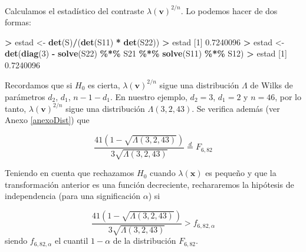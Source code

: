 \documentclass[
  a4paper,
  oneside]{scrbook}
\newenvironment{Shaded}{\begin{snugshade}}{\end{snugshade}}
\newcommand{\DecValTok}[1]{\textcolor[rgb]{0.00,0.00,0.81}{#1}}
\newcommand{\FloatTok}[1]{\textcolor[rgb]{0.00,0.00,0.81}{#1}}
\newcommand{\FunctionTok}[1]{\textcolor[rgb]{0.13,0.29,0.53}{\textbf{#1}}}
\newcommand{\NormalTok}[1]{#1}
\newcommand{\OtherTok}[1]{\textcolor[rgb]{0.56,0.35,0.01}{#1}}
\newcommand{\SpecialCharTok}[1]{\textcolor[rgb]{0.81,0.36,0.00}{\textbf{#1}}}
\theoremstyle{definition}
\theoremstyle{definition}
\theoremstyle{definition}
\theoremstyle{definition}
\theoremstyle{remark}
\begin{document}
Calculamos el estadístico del contraste \(\lambda(\bm{v})^{2/n}\). Lo
podemos hacer de dos formas:

\footnotesize

\begin{Shaded}
\begin{Highlighting}[]
\SpecialCharTok{\textgreater{}}\NormalTok{ estad }\OtherTok{\textless{}{-}} \FunctionTok{det}\NormalTok{(S)}\SpecialCharTok{/}\NormalTok{(}\FunctionTok{det}\NormalTok{(S11) }\SpecialCharTok{*} \FunctionTok{det}\NormalTok{(S22))}
\SpecialCharTok{\textgreater{}}\NormalTok{ estad}
\NormalTok{[}\DecValTok{1}\NormalTok{] }\FloatTok{0.7240096}
\SpecialCharTok{\textgreater{}}\NormalTok{ estad }\OtherTok{\textless{}{-}} \FunctionTok{det}\NormalTok{(}\FunctionTok{diag}\NormalTok{(}\DecValTok{3}\NormalTok{) }\SpecialCharTok{{-}} \FunctionTok{solve}\NormalTok{(S22) }\SpecialCharTok{\%*\%}\NormalTok{ S21 }\SpecialCharTok{\%*\%} \FunctionTok{solve}\NormalTok{(S11) }\SpecialCharTok{\%*\%}\NormalTok{ S12)}
\SpecialCharTok{\textgreater{}}\NormalTok{ estad}
\NormalTok{[}\DecValTok{1}\NormalTok{] }\FloatTok{0.7240096}
\end{Highlighting}
\end{Shaded}

\normalsize

Recordamos que si \(H_0\) es cierta, \(\lambda(\bm{v})^{2/n}\) sigue una
distribución \(\Lambda\) de Wilks de parámetros \(d_2\), \(d_1\), \(n-1-d_1\).
En nuestro ejemplo, \(d_2=3\), \(d_1=2\) y \(n=46\), por lo tanto,
\(\lambda(\bm{v})^{2/n}\) sigue una distribución \(\Lambda(3,2,43)\). Se
verifica además (ver Anexo \ref{anexoDist}) que

\[\frac{41(1-\sqrt{\Lambda(3,2,43)})}{3\sqrt{\Lambda(3,2,43)}}\stackrel{d}{=} F_{6,82}\]

Teniendo en cuenta que rechazamos \(H_0\) cuando \(\lambda(\bm{x})\) es
pequeño y que la transformación anterior es una función decreciente,
rechararemos la hipótesis de independencia (para una significación
\(\alpha\)) si

\[\frac{41(1-\sqrt{\Lambda(3,2,43)})}{3\sqrt{\Lambda(3,2,43)}}>f_{6,82,\alpha}\]
siendo \(f_{6,82,\alpha}\) el cuantil \(1-\alpha\) de la distribución
\(F_{6,82}\).

\footnotesize
\end{document}
